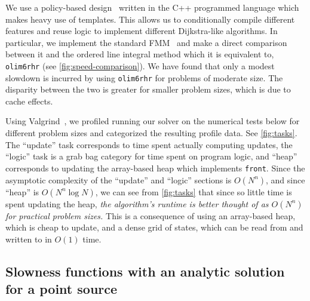 \documentclass{article}
\begin{document}
We use a policy-based design~\cite{alexandrescu2001modern} written in
the C++ programmed language which makes heavy use of templates. This
allows us to conditionally compile different features and reuse logic
to implement different Dijkstra-like algorithms. In particular, we
implement the standard FMM~\cite{sethian1996fast} and make a direct
comparison between it and the ordered line integral method which it is
equivalent to, \texttt{olim6rhr} (see \cref{fig:speed-comparison}). We
have found that only a modest slowdown is incurred by using
\texttt{olim6rhr} for problems of moderate size. The disparity between
the two is greater for smaller problem sizes, which is due to cache
effects.

Using Valgrind~\cite{nethercote2007valgrind}, we profiled running our
solver on the numerical tests below for different problem sizes and
categorized the resulting profile data. See \cref{fig:tasks}. The
``update'' task corresponds to time spent actually computing updates,
the ``logic'' task is a grab bag category for time spent on program
logic, and ``heap'' corresponds to updating the array-based heap which
implements \texttt{front}. Since the asymptotic complexity of the
``update'' and ``logic'' sections is $O(N^n)$, and since ``heap'' is
$O(N^n \log N)$, we can see from \cref{fig:tasks} that since so little
time is spent updating the heap, \emph{the algorithm's runtime is
  better thought of as $O(N^n)$ for practical problem sizes.} This is
a consequence of using an array-based heap, which is cheap to update,
and a dense grid of states, which can be read from and written to in
$O(1)$ time.

\subsection[Single point source]{Slowness functions with an analytic
  solution for a point source}\label{ssec:point-source-problems}
\end{document}

